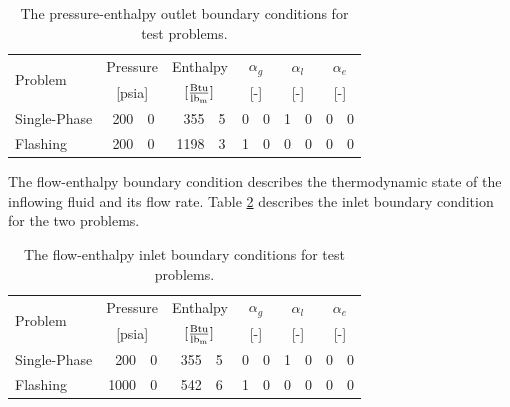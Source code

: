 \begin{table}[ht]
\centering
\begin{tabular}{@{}lr@{.}lr@{.}lr@{.}lr@{.}lr@{.}l@{}} \toprule
\multirow{2}{*}{Problem} & \multicolumn{2}{c}{Pressure} & \multicolumn{2}{c}{Enthalpy}             & \multicolumn{2}{c}{$\alpha_g$} & \multicolumn{2}{c}{$\alpha_l$} & \multicolumn{2}{c}{$\alpha_e$} \\ 
                         & \multicolumn{2}{c}{[psia]} & \multicolumn{2}{c}{$[\frac{\text{Btu}}{\lbm{}}]$} & \multicolumn{2}{c}{[-]}      & \multicolumn{2}{c}{[-]}      & \multicolumn{2}{c}{[-]}      \\ \midrule
Single-Phase             &  200&0                       &  355&5                                   & 0&0                            & 1&0                            & 0&0 \\
Flashing                 &  200&0                       & 1198&3                                   & 1&0                            & 0&0                            & 0&0 \\ \bottomrule  
\end{tabular}
\caption{The pressure-enthalpy outlet boundary conditions for test problems.}
\label{tab:bc_pe}
\end{table}

The flow-enthalpy boundary condition describes the thermodynamic state of the inflowing fluid and its flow rate.
Table \ref{tab:bc_fe} describes the inlet boundary condition for the two problems.

\begin{table}[ht]
\centering
\begin{tabular}{@{}lr@{.}lr@{.}lr@{.}lr@{.}lr@{.}l@{}} \toprule
\multirow{2}{*}{Problem} & \multicolumn{2}{c}{Pressure} & \multicolumn{2}{c}{Enthalpy}             & \multicolumn{2}{c}{$\alpha_g$} & \multicolumn{2}{c}{$\alpha_l$} & \multicolumn{2}{c}{$\alpha_e$} \\ 
                         & \multicolumn{2}{c}{[psia]} & \multicolumn{2}{c}{$[\frac{\text{Btu}}{\lbm{}}]$} & \multicolumn{2}{c}{[-]}      & \multicolumn{2}{c}{[-]}      & \multicolumn{2}{c}{[-]}      \\ \midrule
Single-Phase             &  200&0                       &  355&5                                   & 0&0                            & 1&0                            & 0&0 \\
Flashing                 & 1000&0                       &  542&6                                   & 1&0                            & 0&0                            & 0&0 \\ \bottomrule  
\end{tabular}
\caption{The flow-enthalpy inlet boundary conditions for test problems.}
\label{tab:bc_fe}
\end{table}

